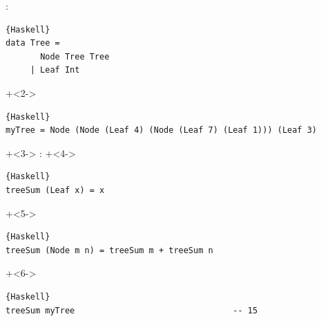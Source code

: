 \begin{frame}[fragile]{}
:
\begin{lstlisting}{Haskell}
data Tree =
       Node Tree Tree
     | Leaf Int
\end{lstlisting}

\onslide+<2->
\begin{lstlisting}{Haskell}
myTree = Node (Node (Leaf 4) (Node (Leaf 7) (Leaf 1))) (Leaf 3)
\end{lstlisting}


\onslide+<3->
:
\onslide+<4->
\begin{lstlisting}{Haskell}
treeSum	(Leaf x) = x
\end{lstlisting}
\onslide+<5->
\vspace{-1.1em}
\begin{lstlisting}{Haskell}
treeSum (Node m n) = treeSum m + treeSum n
\end{lstlisting}
\onslide+<6->
\begin{lstlisting}{Haskell}
treeSum myTree                                -- 15
\end{lstlisting}
\end{frame}


